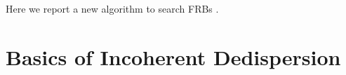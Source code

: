 \documentclass[iop]{emulateapj}
\begin{document}
Here we report a new algorithm to search FRBs . 





\section{Basics of Incoherent Dedispersion}
\label{sec:obs}
\end{document}
